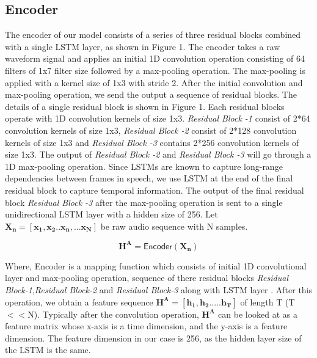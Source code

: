 \documentclass{article}
\begin{document}
\subsection{Encoder}
The encoder of our model consists of a series of three residual blocks combined with a single LSTM layer, as shown in Figure 1. The encoder takes a raw waveform signal and applies an initial 1D convolution operation consisting of 64 filters of 1x7 filter size followed by a max-pooling operation. The max-pooling is applied with a kernel size of 1x3 with stride 2. After the initial convolution and max-pooling operation, we send the output a sequence of residual blocks. The details of a single residual block is shown in Figure 1. Each residual blocks operate with 1D convolution kernels of size 1x3. \textit{Residual Block -1} consist of 2*64 convolution kernels of size 1x3, \textit{Residual Block -2} consist of 2*128 convolution kernels of size 1x3 and \textit{Residual Block -3} contains 2*256 convolution kernels of size 1x3. The output of \textit{Residual Block -2} and \textit{Residual Block -3} will go through a 1D max-pooling operation. Since LSTMs are known to capture long-range dependencies between frames in speech, we use LSTM at the end of the final residual block to capture temporal information. The output of the final residual block \textit{Residual Block -3} after the max-pooling operation is sent to a single unidirectional LSTM layer with a hidden size of 256. Let $\boldsymbol{X_n=[x_1,x_2..x_n,...x_N]}$ be raw audio sequence with N samples.  

\begin{equation}
\boldsymbol{H^A} = \textsf{Encoder}(\boldsymbol{X_n})
\end{equation}

Where, \textsf{Encoder} is a mapping function which consists of initial 1D convolutional layer and max-pooling operation, sequence of there residual blocks \textit{Residual Block-1},\textit{Residual Block-2} and \textit{Residual Block-3} along with LSTM layer . After this operation, we obtain a feature sequence  $\boldsymbol{H^A=[h_1,h_2.....h_T]}$ of length T (T$<<$N). Typically after the convolution operation, $\boldsymbol{H^A}$ can be looked at as a feature matrix whose x-axis is a time dimension, and the y-axis is a feature dimension. The feature dimension in our case is 256, as the hidden layer size of the LSTM is the same.
\end{document}
